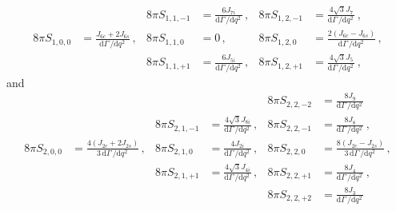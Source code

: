 \documentclass[aps,prd,reprint,nofootinbib,preprintnumbers]{revtex4}
\newcommand{\rmdx}[1]{\mbox{d} #1 \,} %
\begin{document}
\begin{equation}
\begin{aligned}
%
                      &                                                                                    &
    8\pi S_{1, 1, -1} & = \frac{6 J_{7i}}{\rmdx{\Gamma}/\rmdx{q^2}}\,,                                     &
    8\pi S_{1, 2, -1} & = \frac{4 \sqrt{3} J_{7}}{\rmdx{\Gamma}/\rmdx{q^2}}\,,                             \\
%
    8\pi S_{1, 0,  0} & = \frac{J_{6c} + 2 J_{6s}}{\rmdx{\Gamma}/\rmdx{q^2}}\,,                            &
    8\pi S_{1, 1,  0} & = 0\,,                                                                             &
    8\pi S_{1, 2,  0} & = \frac{2(J_{6c} - J_{6s})}{\rmdx{\Gamma}/\rmdx{q^2}}\,,                           \\
%
                      &                                                                                    &
    8\pi S_{1, 1, +1} & = \frac{6 J_{5i}}{\rmdx{\Gamma}/\rmdx{q^2}}\,,                                     &
    8\pi S_{1, 2, +1} & = \frac{4 \sqrt{3} J_{5}}{\rmdx{\Gamma}/\rmdx{q^2}}\,,
\end{aligned}
\end{equation}
and
\begin{equation}
\begin{aligned}
%
                      &                                                                                    &
                      &                                                                                    &
    8\pi S_{2, 2, -2} & = \frac{8 J_9}{\rmdx{\Gamma}/\rmdx{q^2}}                                           \\
%
                      &                                                                                    &
    8\pi S_{2, 1, -1} & = \frac{4 \sqrt{3} J_{8i}}{\rmdx{\Gamma}/\rmdx{q^2}}\,,                            &
    8\pi S_{2, 2, -1} & = \frac{8 J_8}{\rmdx{\Gamma}/\rmdx{q^2}}\,,                                        \\
%
    8\pi S_{2, 0,  0} & = \frac{4 (J_{2c} + 2 J_{2s})}{3\, \rmdx{\Gamma}/\rmdx{q^2}}\,,                    &
    8\pi S_{2, 1,  0} & = \frac{4 J_{2i}}{\rmdx{\Gamma}/\rmdx{q^2}}\,,                                     &
    8\pi S_{2, 2,  0} & = \frac{8 (J_{2c} - J_{2s})}{3\, \rmdx{\Gamma}/\rmdx{q^2}}\,,                      \\
%
                      &                                                                                    &
    8\pi S_{2, 1, +1} & = \frac{4\sqrt{3} J_{4i}}{\rmdx{\Gamma}/\rmdx{q^2}}\,,                             &
    8\pi S_{2, 2, +1} & = \frac{8 J_{4}}{\rmdx{\Gamma}/\rmdx{q^2}}\,,                                      \\
%
                      &                                                                                    &
                      &                                                                                    &
    8\pi S_{2, 2, +2} & = \frac{8 J_3}{\rmdx{\Gamma}/\rmdx{q^2}}                                           \\
\end{aligned}
\end{equation}
\end{document}
